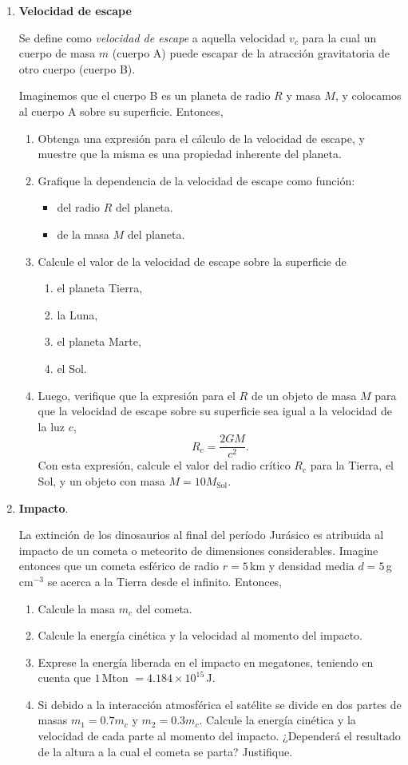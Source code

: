 \documentclass[a4paper,12pt]{article}
\begin{document}
\begin{enumerate}
\item {\bf{Velocidad de escape}}

Se define como {\emph{velocidad de escape}} a aquella velocidad $v_c$ para la cual un cuerpo de masa $m$ (cuerpo A) puede escapar de la atracción gravitatoria de otro cuerpo (cuerpo B).

Imaginemos que el cuerpo B es un planeta de radio $R$ y masa $M$, y colocamos al cuerpo A sobre su superficie. Entonces,
 
\begin{enumerate}
\item Obtenga una expresión para el cálculo de la velocidad de escape, y muestre que la misma es una propiedad inherente del planeta.
\item Grafique la dependencia de la velocidad de escape como función:
\begin{itemize}
\item del radio $R$ del planeta.
\item de la masa $M$ del planeta.
\end{itemize}
\item Calcule el valor de la velocidad de escape sobre la superficie de 
\begin{enumerate}
\item el planeta Tierra,
\item la Luna,
\item el planeta Marte,
\item el Sol.
\end{enumerate}
\item Luego, verifique que la expresión para el $R$ de un objeto de masa $M$ para que la velocidad de escape sobre su superficie sea igual a la velocidad de la luz $c$, 
  \[ R_c = \frac{2GM}{c^2}.\]  
  Con esta expresión, calcule el valor del radio crítico $R_c$ para la Tierra, el Sol, y un objeto con masa $M=10 M_{\mathrm{Sol}}$.

\end{enumerate}

\item {\bf{Impacto}}.

La extinción de los dinosaurios al final del período Jurásico es atribuida al impacto de un cometa o meteorito de dimensiones considerables. Imagine entonces que un cometa esférico de radio $r=5$\,km y densidad media $d=5$\,g\,cm$^{-3}$ se acerca a la Tierra desde el infinito. Entonces,

\begin{enumerate}
\item Calcule la masa $m_c$ del cometa.
\item Calcule la energía cinética y la velocidad al momento del impacto.
\item Exprese la energía liberada en el impacto en megatones, teniendo en cuenta que $1$\,Mton $= 4.184 \times 10^{15}$\,J.
\item Si debido a la interacción atmosférica el satélite se divide en dos partes de masas $m_1=0.7 m_c$ y $m_2=0.3 m_c$. Calcule la energía cinética y la velocidad de cada parte al momento del impacto. ¿Dependerá el resultado de la altura a la cual el cometa se parta? Justifique.
\end{enumerate}


\end{enumerate}
\end{document}
